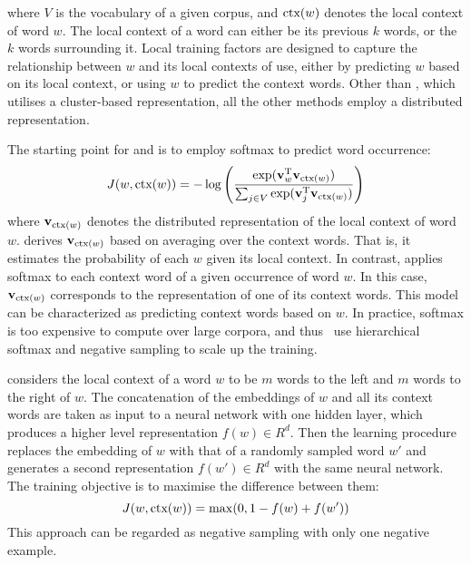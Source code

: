 where $V$ is the vocabulary of a given corpus, and $\text{ctx}(w)$ denotes the
local context of word $w$.
The local context of a word can either be its previous $k$ words, or the
$k$ words surrounding it. 
Local training factors are designed to capture the relationship between
$w$ and its local contexts of use, either by predicting $w$
based on its local context, or using $w$ to predict the
context words. Other than \brown, which utilises a cluster-based
representation, all the other methods employ a distributed representation.

The starting point for \CBOW and \Skipgram is to employ softmax to predict word occurrence:
\begin{displaymath}
  J(w, \text{ctx}(w)) = - \log \left( \frac{\exp(\mathbf{v}_w^{\text{T}} \mathbf{v}_{\text{ctx}(w)})}{ \sum_{j \in V} \exp(\mathbf{v}_j^{\text{T}} \mathbf{v}_{\text{ctx}(w)})} \right)
\end{displaymath}
where $\mathbf{v}_{\text{ctx}(w)}$ denotes the distributed representation of
the local context of word $w$. \CBOW derives $\mathbf{v}_{\text{ctx}(w)}$
based on averaging over the context words. That is, it estimates the
probability of each $w$ given its local
context. In contrast, \Skipgram applies softmax to each context word of
a given occurrence of word $w$. In this case, $\mathbf{v}_{\text{ctx}(w)}$ corresponds to the
representation of one of its context words. This model can be characterized as
predicting context words based on $w$. In practice, softmax is
too expensive to compute over large corpora, and thus~ use
hierarchical softmax and negative sampling to scale up the training.

\CW considers the local context of a word $w$ to be $m$ words to the left
and $m$ words to the right of $w$. The concatenation of the embeddings of
$w$ and all its context words are taken as input to a neural network
with one hidden layer, which produces a higher level representation
$f(w) \in R^d$. Then the learning procedure replaces the embedding of
$w$ with that of a randomly sampled word $w'$ and generates a second
representation $f(w') \in R^d$ with the same neural network. The
training objective is to maximise the difference between them:
\begin{displaymath}
J(w, \text{ctx}(w)) = \max (0, 1 - f(w) + f(w'))
\end{displaymath}
This approach can be regarded as negative sampling with only one negative example.


